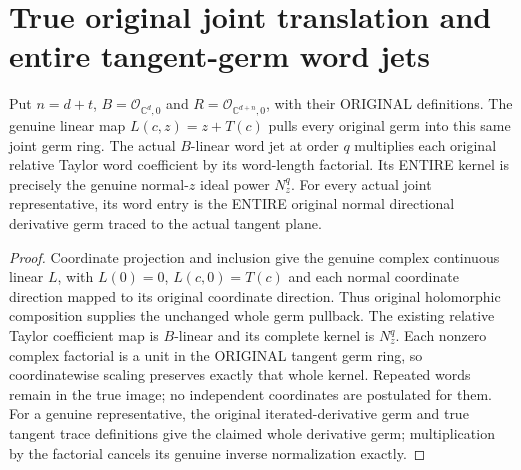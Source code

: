 \section{True original joint translation and entire tangent-germ word jets}

\begin{definition}
\label{hir:actual-centre-joint-original-word-jet}
Put $n=d+t$, $B=\mathcal O_{\mathbb C^d,0}$ and
$R=\mathcal O_{\mathbb C^{d+n},0}$, with their ORIGINAL definitions.
The genuine linear map $L(c,z)=z+T(c)$ pulls every original germ into
this same joint germ ring. The actual $B$-linear word jet at order
$q$ multiplies each original relative Taylor word coefficient by its
word-length factorial. Its ENTIRE kernel is precisely the genuine
normal-$z$ ideal power $N_z^q$. For every actual joint representative,
its word entry is the ENTIRE original normal directional derivative
germ traced to the actual tangent plane.
\leanok
\end{definition}
\begin{proof}
Coordinate projection and inclusion give the genuine complex continuous
linear $L$, with $L(0)=0$, $L(c,0)=T(c)$ and each normal coordinate
direction mapped to its original coordinate direction. Thus original
holomorphic composition supplies the unchanged whole germ pullback.
The existing relative Taylor coefficient map is $B$-linear and its
complete kernel is $N_z^q$. Each nonzero complex factorial is a unit
in the ORIGINAL tangent germ ring, so coordinatewise scaling preserves
exactly that whole kernel. Repeated words remain in the true image;
no independent coordinates are postulated for them. For a genuine
representative, the original iterated-derivative germ and true tangent
trace definitions give the claimed whole derivative germ; multiplication
by the factorial cancels its genuine inverse normalization exactly.
\end{proof}

